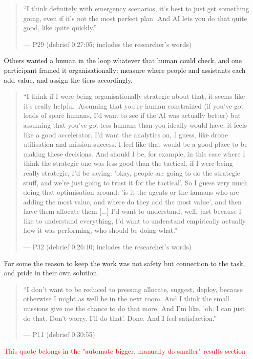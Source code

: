 \begin{quote}\small
``I think definitely with emergency scenarios, it's best to just get something going, even if it's not the most perfect plan. And AI lets you do that quite good, like quite quickly.''\par\hfill--- P29 (debrief 0:27:05; includes the researcher's words)
\end{quote}


\label{sec:qual:who-decides:loop}
Others wanted a human in the loop whatever that human could check, and one participant framed it organisationally: measure where people and assistants each add value, and assign the tiers accordingly.

\begin{quote}\small
``I think if I were being organisationally strategic about that, it seems like it's really helpful. Assuming that you're human constrained (if you've got loads of spare humans, I'd want to see if the AI was actually better) but assuming that you've got less humans than you ideally would have, it feels like a good accelerator. I'd want the analytics on, I guess, like drone utilisation and mission success. I feel like that would be a good place to be making these decisions. And should I be, for example, in this case where I think the strategic one was less good than the tactical, if I were being really strategic, I'd be saying: 'okay, people are going to do the strategic stuff, and we're just going to trust it for the tactical'. So I guess very much doing that optimisation around: 'is it the agents or the humans who are adding the most value, and where do they add the most value', and then have them allocate them [...] I'd want to understand, well, just because I like to understand everything, I'd want to understand empirically actually how it was performing, who should be doing what.''\par\hfill--- P32 (debrief 0:26:10; includes the researcher's words)
\end{quote}


\label{sec:qual:who-decides:ownership}
For some the reason to keep the work was not safety but connection to the task, and pride in their own solution.

\begin{quote}\small
``I don't want to be reduced to pressing allocate, suggest, deploy, because otherwise I might as well be in the next room. And I think the small missions give me the chance to do that more. And I'm like, 'oh, I can just do that. Don't worry. I'll do that'. Done. And I feel satisfaction.''\par\hfill--- P11 (debrief 0:30:55)
\end{quote}
\textcolor{red}{This quote belongs in the "automate bigger, manually do smaller" results section}

